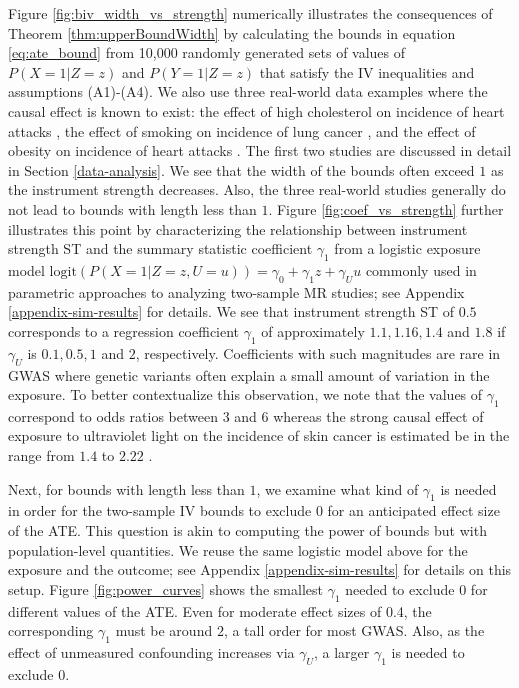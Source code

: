 \documentclass[
]{article}
\theoremstyle{plain}
\begin{document}
Figure \ref{fig:biv_width_vs_strength} numerically illustrates the consequences of Theorem \ref{thm:upperBoundWidth} by calculating the bounds in equation \eqref{eq:ate_bound} from 10,000 randomly generated sets of values of \(P(X = 1 | Z = z)\) and \(P(Y = 1 | Z = z)\) that satisfy the IV inequalities and assumptions (A1)-(A4). We also use three real-world data examples where the causal effect is known to exist: the effect of high cholesterol on incidence of heart attacks \autocite{cholesterol_treatment_trialists_ctt_collaborators_effects_2012}, the effect of smoking on incidence of lung cancer \autocite{cornfield_smoking_1959}, and the effect of obesity on incidence of heart attacks \autocite{yusuf_obesity_2005}. The first two studies are discussed in detail in Section \ref{data-analysis}. We see that the width of the bounds often exceed \(1\) as the instrument strength decreases. Also, the three real-world studies generally do not lead to bounds with length less than \(1\). Figure \ref{fig:coef_vs_strength} further illustrates this point by characterizing the relationship between instrument strength ST and the summary statistic coefficient \(\gamma_1\) from a logistic exposure model \(\text{logit}(P(X = 1 | Z = z, U = u)) = \gamma_0 + \gamma_1 z + \gamma_U u\) commonly used in parametric approaches to analyzing two-sample MR studies; see Appendix \ref{appendix-sim-results} for details. We see that instrument strength ST of \(0.5\) corresponds to a regression coefficient \(\gamma_1\) of approximately \(1.1, 1.16, 1.4\) and \(1.8\) if \(\gamma_U\) is \(0.1, 0.5, 1\) and \(2\), respectively. Coefficients with such magnitudes are rare in GWAS where genetic variants often explain a small amount of variation in the exposure. To better contextualize this observation, we note that the values of \(\gamma_1\) correspond to odds ratios between \(3\) and \(6\) whereas the strong causal effect of exposure to ultraviolet light on the incidence of skin cancer is estimated be in the range from \(1.4\) to \(2.22\) \autocite{schmitt_occupational_2011}.

Next, for bounds with length less than \(1\), we examine what kind of \(\gamma_1\) is needed in order for the two-sample IV bounds to exclude \(0\) for an anticipated effect size of the ATE. This question is akin to computing the power of bounds but with population-level quantities. We reuse the same logistic model above for the exposure and the outcome; see Appendix \ref{appendix-sim-results} for details on this setup. Figure \ref{fig:power_curves} shows the smallest \(\gamma_1\) needed to exclude \(0\) for different values of the ATE. Even for moderate effect sizes of 0.4, the corresponding \(\gamma_1\) must be around \(2\), a tall order for most GWAS. Also, as the effect of unmeasured confounding increases via \(\gamma_U\), a larger \(\gamma_1\) is needed to exclude \(0\).
\end{document}
